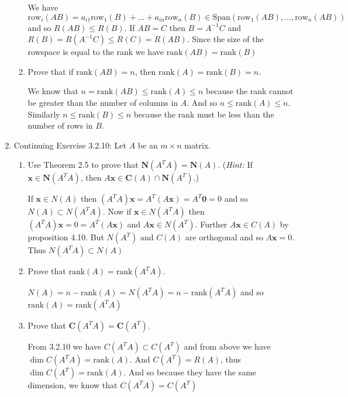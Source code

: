 \documentclass[letterpaper]{article}
\newcommand{\rank}{\text{rank}}
\newcommand{\Span}{\text{Span}}
\begin{document}
\begin{enumerate}
\begin{enumerate}
  We have $\text{row}_i(AB)=a_{i1}\text{row}_1(B)+\dots+a_{in}\text{row}_n(B)\in\Span(\text{row}_1(AB),\dots,\text{row}_n(AB))$ and so $R(AB)\le R(B)$. If $AB=C$ then $B=A^{-1}C$ and $R(B)=R(A^{-1}C)\le R(C)=R(AB)$. Since the size of the rowspace is equal to the rank we have $\rank(AB)=\rank(B)$
  \item
  Prove that if $\rank(AB)=n$, then $\rank(A)=\rank(B)=n$.

  We know that $n=\rank(AB)\le \rank (A)\le n$ because the rank cannot be greater than the number of columns in $A$. And so $n\le \rank(A)\le n$. Similarly $n\le \rank(B)\le n$ because the rank must be less than the number of rows in $B$.
  \end{enumerate}
\setcounter{enumi}{23}
\item
Continuing Exercise 3.2.10: Let $A$ be an $m\times n$ matrix.
  \begin{enumerate}
  \item
  Use Theorem 2.5 to prove that $\mathbf{N}(A^TA)=\mathbf{N}(A)$. (\emph{Hint:} If $\mathbf{x}\in \mathbf{N}(A^TA)$, then $A\mathbf{x}\in \mathbf{C}(A)\cap \mathbf{N}(A^T)$.)

  If $\mathbf{x}\in N(A)$ then $(A^TA)\mathbf{x}=A^T(A\mathbf{x})=A^T\mathbf{0}=0$ and so $N(A)\subset N(A^TA)$. Now if $\mathbf{x}\in N(A^TA)$ then $(A^TA)\mathbf{x}=0=A^T(A\mathbf{x})$ and $A\mathbf{x}\in N(A^T)$. Further $A\mathbf{x}\in C(A)$ by proposition 4.10. But $N(A^T)$ and $C(A)$ are orthogonal and so $A\mathbf{x}=0$. Thus $N(A^TA)\subset N(A)$
  \item
  Prove that $\rank(A)=\rank(A^TA)$.

  $N(A)=n-\rank(A)=N(A^TA)=n-\rank(A^TA)$ and so $\rank(A)=\rank(A^TA)$
  \item
  Prove that $\mathbf{C}(A^TA)=\mathbf{C}(A^T)$.

  From 3.2.10 we have $C(A^TA)\subset C(A^T)$ and from above we have $\dim C(A^TA)=\rank(A)$. And $C(A^T)=R(A)$, thus $\dim C(A^T)=\rank(A)$. And so because they have the same dimension, we know that $C(A^TA)=C(A^T)$
  \end{enumerate}
\end{enumerate}
\end{document}

